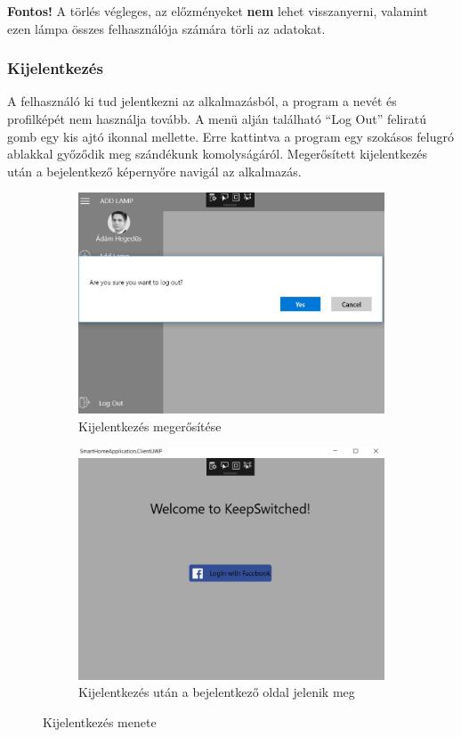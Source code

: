 \documentclass[a4paper,12pt]{report}
\begin{document}
    \textbf{Fontos!} A törlés végleges, az előzményeket \textbf{nem} lehet visszanyerni, valamint ezen lámpa összes felhasználója
    számára törli az adatokat.

\subsubsection{Kijelentkezés}
    A felhasználó ki tud jelentkezni az alkalmazásból, a program a nevét és profilképét nem használja tovább. A menü alján
    található ``Log Out'' feliratú gomb egy kis ajtó ikonnal mellette. Erre kattintva a program egy szokásos felugró ablakkal
    győződik meg szándékunk komolyságáról. Megerősített kijelentkezés után a bejelentkező képernyőre navigál az alkalmazás.

\begin{figure}[H]
    \centering
    \begin{subfigure}[b]{0.4\linewidth}
        \includegraphics[width=\linewidth]{images/logoutsure.jpg}
        \caption{Kijelentkezés megerősítése}
    \end{subfigure}
    \begin{subfigure}[b]{0.4\linewidth}
        \includegraphics[width=\linewidth]{images/logoutbacktologin.jpg}
        \caption{Kijelentkezés után a bejelentkező oldal jelenik meg}
    \end{subfigure}
    \caption{Kijelentkezés menete}
    \label{fig:Logout}
\end{figure}
\end{document}

